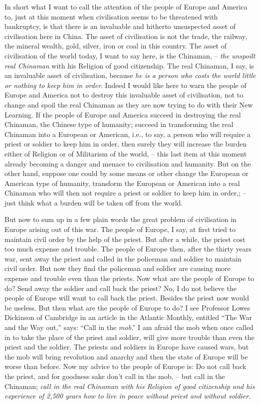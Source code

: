 In short what I want to call the attention of the people of Europe and America to,
just at this moment when civilisation seems to be threatened with bankruptcy,
is that there is an invaluable and hitherto unsuspected asset of civilisation here in China.
The asset of civilisation is not the trade, the railway, the mineral wealth, gold, silver, iron or coal in this country.
The asset of civilisation of the world today, I want to say here, is the Chinaman, -- \emph{the unspoilt real Chinaman} with his Religion of good citizenship. The real Chinaman,
I say, is an invaluable asset of civilisation, because \emph{he is a person who costs the world little or nothing to keep him in order}.
Indeed I would like here to warn the people of Europe and America not to destroy this invaluable asset of civilisation,
not to change and spoil the real Chinaman as they are now trying to do with their New Learning.
If the people of Europe and America succeed in destroying the real Chinaman, the Chinese type of humanity;
succeed in transforming the real Chinaman into a European or American, i.e., to say, a person who will require a priest or soldier to keep him in order,
then surely they will increase the burden either of Religion or of Militarism of the world,
-- this last item at this moment already becoming a danger and menace to civilisation and humanity.
But on the other hand, suppose one could by some means or other change the European or American type of humanity,
transform the European or American into a real Chinaman who will then not require a priest or soldier to keep him in order,;
-- just think what a burden will be taken off from the world.

But now to sum up in a few plain words the great problem of civilisation in Europe arising out of this war.
The people of Europe, I say, at first tried to maintain civil order by the help of the priest.
But after a while, the priest cost too much expense and trouble.
The people of Europe then, after the thirty years war, sent away the priest and called in the policeman and soldier to maintain civil order.
But now they find the policeman and soldier are causing more expense and trouble even than the priests.
Now what are the people of Europe to do?
Send away the soldier and call back the priest?
No, I do not believe the people of Europe will want to call back the priest.
Besides the priest now would be useless.
But then what are the people of Europe to do?
I see Professor Lowes Dickinson of Cambridge in an article in the Atlantic Monthly,
entitled ``The War and the Way out,'' says: ``Call in the \emph{mob}.''
I am afraid the mob when once called in to take the place of the priest and soldier,
will give more trouble than even the priest and the soldier.
The priests and soldiers in Europe have caused wars, but the mob will bring revolution and anarchy and then the state of Europe will be worse than before.
Now my advice to the people of Europe is: Do not call back the priest, and for goodness sake don't call in the mob,
-- but call in the Chinaman;
\emph{call in the real Chinaman with his Religion of good citizenship
and his experience of 2,500 years
how to live in peace without priest and without soldier}.

